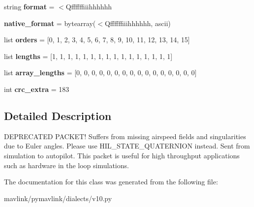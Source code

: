 \begin{DoxyCompactItemize}
\item 
\mbox{\label{classpymavlink_1_1dialects_1_1v10_1_1MAVLink__hil__state__message_a3350aeca536f99984e760deb155a9c62}} 
string {\bfseries format} = \textquotesingle{}$<$Qffffffiiihhhhhh\textquotesingle{}
\item 
\mbox{\label{classpymavlink_1_1dialects_1_1v10_1_1MAVLink__hil__state__message_a89a1228655510261c3bfe0623f9fbc3d}} 
{\bfseries native\+\_\+format} = bytearray(\textquotesingle{}$<$Qffffffiiihhhhhh\textquotesingle{}, \textquotesingle{}ascii\textquotesingle{})
\item 
\mbox{\label{classpymavlink_1_1dialects_1_1v10_1_1MAVLink__hil__state__message_aa68f06b2fb32371c9862fe6dc3a5b608}} 
list {\bfseries orders} = \mbox{[}0, 1, 2, 3, 4, 5, 6, 7, 8, 9, 10, 11, 12, 13, 14, 15\mbox{]}
\item 
\mbox{\label{classpymavlink_1_1dialects_1_1v10_1_1MAVLink__hil__state__message_a50c95a4ad63f4176f9c51eaa795e3332}} 
list {\bfseries lengths} = \mbox{[}1, 1, 1, 1, 1, 1, 1, 1, 1, 1, 1, 1, 1, 1, 1, 1\mbox{]}
\item 
\mbox{\label{classpymavlink_1_1dialects_1_1v10_1_1MAVLink__hil__state__message_a3d5cba68b84f83b1f99460be95202484}} 
list {\bfseries array\+\_\+lengths} = \mbox{[}0, 0, 0, 0, 0, 0, 0, 0, 0, 0, 0, 0, 0, 0, 0, 0\mbox{]}
\item 
\mbox{\label{classpymavlink_1_1dialects_1_1v10_1_1MAVLink__hil__state__message_a4c89c5cb7e63977b546dde7b8528ce1a}} 
int {\bfseries crc\+\_\+extra} = 183
\end{DoxyCompactItemize}


\subsection{Detailed Description}
\begin{DoxyVerb}DEPRECATED PACKET! Suffers from missing airspeed fields and
singularities due to Euler angles. Please use
HIL_STATE_QUATERNION instead. Sent from simulation to
autopilot. This packet is useful for high throughput
applications such as hardware in the loop simulations.
\end{DoxyVerb}
 

The documentation for this class was generated from the following file\+:\begin{DoxyCompactItemize}
\item 
mavlink/pymavlink/dialects/v10.\+py\end{DoxyCompactItemize}
